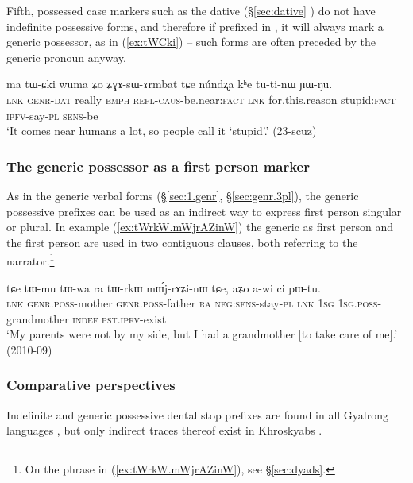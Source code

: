 Fifth, possessed case markers such as the dative  (§\ref{sec:dative} ) do not have indefinite possessive forms, and therefore if prefixed in , it will always mark a generic possessor, as in (\ref{ex:tWCki}) -- such forms are often preceded by the generic pronoun  anyway.

\begin{exe}
\ex \label{ex:tWCki}
\gll ma tɯ-ɕki wuma ʑo ʑɣɤ-sɯ-ɤrmbat tɕe núndʐa kʰe tu-ti-nɯ ɲɯ-ŋu. \\
\textsc{lnk} \textsc{genr}-\textsc{dat} really \textsc{emph} \textsc{refl}-\textsc{caus}-be.near:\textsc{fact} \textsc{lnk} for.this.reason stupid:\textsc{fact} \textsc{ipfv}-say-\textsc{pl} \textsc{sens}-be \\
\glt `It comes near humans a lot, so people call it `stupid'.' (23-scuz) 
\end{exe}

\subsubsection{The generic possessor as a first person marker} \label{sec:generic.tW.1sg}
As in the generic verbal forms (§\ref{sec:1.genr}, §\ref{sec:genr.3pl}), the generic possessive prefixes can be used as an indirect way to express first person singular or plural. In example (\ref{ex:tWrkW.mWjrAZinW}) the generic as first person and the first person are used in two contiguous clauses, both referring to the narrator.\footnote{On the phrase  in (\ref{ex:tWrkW.mWjrAZinW}), see §\ref{sec:dyads}. }

\begin{exe}
\ex \label{ex:tWrkW.mWjrAZinW}
\gll tɕe tɯ-mu tɯ-wa ra tɯ-rkɯ mɯ́j-rɤʑi-nɯ tɕe, aʑo a-wi ci pɯ-tu. \\
\textsc{lnk} \textsc{genr}.\textsc{poss}-mother \textsc{genr}.\textsc{poss}-father \textsc{ra} \textsc{neg}:\textsc{sens}-stay-\textsc{pl} \textsc{lnk} \textsc{1sg} \textsc{1sg}.\textsc{poss}-grandmother \textsc{indef} \textsc{pst}.\textsc{ipfv}-exist \\ 
\glt `My parents were not by my side, but I had a grandmother [to take care of me].' (2010-09)
\end{exe}

\subsubsection{Comparative perspectives} \label{sec:indef.t.comparative}
Indefinite and generic possessive dental stop prefixes are found in all Gyalrong languages \citep{jackson98morphology}, but only indirect traces thereof exist in Khroskyabs \citep[155]{lai17khroskyabs}. 

